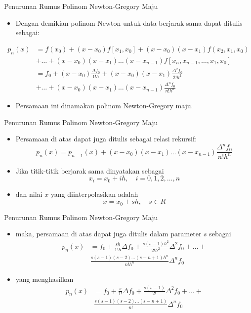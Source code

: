 \documentclass[pdflatex,compress,mathserif]{beamer}
\begin{document}
\begin{frame}{Penurunan Rumus Polinom Newton-Gregory Maju}
	\begin{itemize}
		\item Dengan demikian polinom Newton untuk data berjarak sama dapat ditulis sebagai:
	\end{itemize}
	\begin{align*}
		p_n(x) &= f(x_0) + (x - x_0) f[x_1, x_0] + (x - x_0 )(x - x_1)f(x_2, x_1, x_0) \\
		&+ \dots + (x - x_0)(x-x_1)\dots(x-x_{n-1})f[x_n, x_{n-1} , \dots, x_1, x_0] \\
		&= f_0 + (x - x_0) \frac{\Delta f_0}{1!h} + (x - x_0)(x - x_1)\frac{\Delta^2 f_0}{2!h^2} \\
		& + \dots + (x - x_0)(x - x_1)\dots(x - x_{n-1})\frac{\Delta^n f_0}{n!h^n}
	\end{align*}
	\begin{itemize}
		\item Persamaan ini dinamakan polinom Newton-Gregory maju.
	\end{itemize}
\end{frame}

\begin{frame}{Penurunan Rumus Polinom Newton-Gregory Maju}
	\begin{itemize}
		\item Persamaan di atas dapat juga ditulis sebagai relasi rekursif:
		\[ p_n(x) = p_{n-1}(x) + (x-x_0)(x-x_1)\dots(x-x_{n-1})\frac{\Delta^nf_0}{n!h^n}\]
		\item Jika titik-titik berjarak sama dinyatakan sebagai
		\[ x_i = x_0 + ih,\quad i = 0,1,2,\dots,n \]
		\item dan nilai $ x $ yang diinterpolasikan adalah
		\[ x = x_0 + sh,\quad s \in R \]
	\end{itemize}
\end{frame}

\begin{frame}{Penurunan Rumus Polinom Newton-Gregory Maju}
	\begin{itemize}
		\item maka, persamaan di atas dapat juga ditulis dalam parameter $ s $ sebagai
		\begin{align*}
			p_n(x) &= f_0 + \frac{sh}{1!h}\Delta f_0 + \frac{s(s-1)h^2}{2!h^2}\Delta^2 f_0 + \dots + \\
			& \frac{s(s-1)(s-2) \dots (s-n+1)h^n}{n!h^n}\Delta^n f_0
		\end{align*}
		\item yang menghasilkan
		\begin{align*}
			p_n(x) &= f_0 + \frac{s}{1!}\Delta f_0 + \frac{s(s-1)}{2!}\Delta^2 f_0 + \dots + \\
			& \frac{s(s-1)(s-2) \dots (s-n+1)}{n!}\Delta^n f_0
		\end{align*}
	\end{itemize}
\end{frame}
\end{document}
